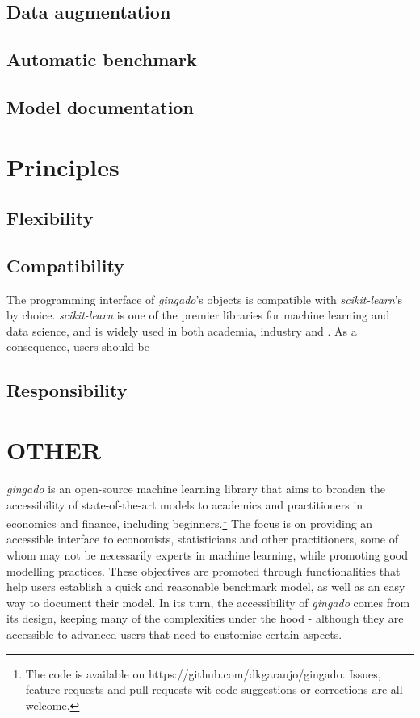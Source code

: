 \documentclass{article}
\begin{document}
\subsection{Data augmentation}

\subsection{Automatic benchmark}

\subsection{Model documentation}

\section{Principles}

\subsection{Flexibility}

\subsection{Compatibility}

The programming interface of \textit{gingado}'s objects is compatible with \textit{scikit-learn}'s by choice. \textit{scikit-learn} is one of the premier libraries for machine learning and data science, and is widely used in both academia, industry and . As a consequence, users should be 

\subsection{Responsibility}


\section{OTHER}

\textit{gingado} is an open-source machine learning library that aims to broaden the accessibility of state-of-the-art models to academics and practitioners in economics and finance, including beginners.\footnote{The code is available on https://github.com/dkgaraujo/gingado. Issues, feature requests and pull requests wit code suggestions or corrections are all welcome.} The focus is on providing an accessible interface to economists, statisticians and other practitioners, some of whom may not be necessarily experts in machine learning, while promoting good modelling practices. These objectives are promoted through functionalities that help users establish a quick and reasonable benchmark model, as well as an easy way to document their model. In its turn, the accessibility of \textit{gingado} comes from its design, keeping many of the complexities under the hood - although they are accessible to advanced users that need to customise certain aspects. 
\end{document}
